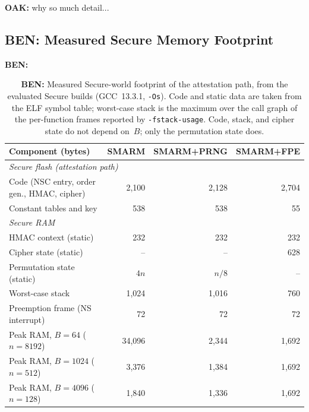 \documentclass{ieeeaccess}
\DeclareRobustCommand{\oak}[1]{{\color{OAKcolor}\textbf{OAK:} #1}}
\DeclareRobustCommand{\ben}[1]{{\color{BENcolor}\textbf{BEN:} #1}}
\newcommand{\rtsmarmone}{SMARM+PRNG\xspace}
\newcommand{\rtsmarmtwo}{SMARM+FPE\xspace}
\begin{document}
\oak{why so much detail...}
\subsection{\ben{Measured Secure Memory Footprint}}
\label{sec:footprint}

\begin{table}[!ht]
  \centering
  \small
  \setlength{\tabcolsep}{4pt}
  \ben{%
  \begin{tabular}{lrrr}
    \toprule
    \textbf{Component (bytes)} & \textbf{SMARM} & \textbf{\rtsmarmone} & \textbf{\rtsmarmtwo} \\
    \midrule
    \multicolumn{4}{l}{\emph{Secure flash (attestation path)}} \\
    Code (NSC entry, order gen., HMAC, cipher) & 2{,}100 & 2{,}128 & 2{,}704 \\
    Constant tables and key & 538 & 538 & 55 \\
    \midrule
    \multicolumn{4}{l}{\emph{Secure RAM}} \\
    HMAC context (static) & 232 & 232 & 232 \\
    Cipher state (static) & -- & -- & 628 \\
    Permutation state (static) & $4n$ & $n/8$ & -- \\
    Worst-case stack & 1{,}024 & 1{,}016 & 760 \\
    Preemption frame (NS interrupt) & 72 & 72 & 72 \\
    \midrule
    Peak RAM, $B = 64$ ($n = 8192$) & 34{,}096 & 2{,}344 & 1{,}692 \\
    \rowcolor{gray!15}
    Peak RAM, $B = 1024$ ($n = 512$) & 3{,}376 & 1{,}384 & 1{,}692 \\
    Peak RAM, $B = 4096$ ($n = 128$) & 1{,}840 & 1{,}336 & 1{,}692 \\
    \bottomrule
  \end{tabular}}
  \caption{\ben{Measured Secure-world footprint of the attestation path, from the evaluated Secure builds (GCC~13.3.1, \texttt{-Os}). Code and static data are taken from the ELF symbol table; worst-case stack is the maximum over the call graph of the per-function frames reported by \texttt{-fstack-usage}. Code, stack, and cipher state do not depend on~$B$; only the permutation state does.}}
  \label{tab:footprint}
\end{table}
\end{document}
